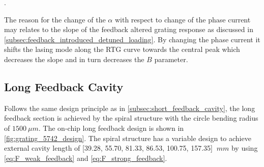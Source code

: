 \begin{table}[ht]
    \centering
    \caption{Measured chirp parameter $\alpha$ by fixing the gain current at $75 \ mA$ and scan the phase section in the external feedback section from $10 \ mA$ to $14 \ mA$. Increasement of the chirp parameter $\alpha$ is observed from $1.793$ to $3.245$}.
    \label{tab:chirp_6559}
\end{table}

The reason for the change of the $\alpha$ with respect to change of the phase current may relates to the slope of the feedback altered grating response as discussed in \autoref{subsec:feedback_introduced_detuned_loading}. By changing the phase current it shifts the lasing mode along the RTG curve towards the central peak which decreases the slope and in turn decreases the $B$ parameter.

\subsection{Long Feedback Cavity} \label{subsec:long_feedback_cavity}
Follows the same design principle as in \autoref{subsec:short_feedback_cavity}, the long feedback section is achieved by the spiral structure with the circle bending radius of $1500 \ \mu m$. The on-chip long feedback design is shown in \autoref{fig:grating_5742_design}. The spiral structure has a variable design to achieve external cavity length of [39.28, 55.70, 81.33, 86.53, 100.75, 157.35] $\ mm$ by using \autoref{eq:F_weak_feedback} and \autoref{eq:F_strong_feedback}.

